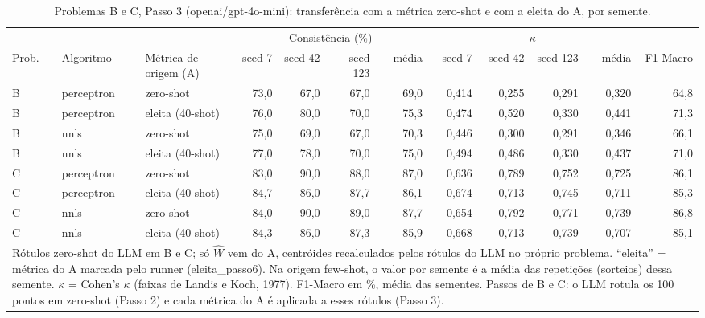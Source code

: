 \begin{table}[htbp]
\centering
\footnotesize
\caption{Problemas B e C, Passo 3 (openai/gpt-4o-mini): transferência com a métrica zero-shot e com a eleita do A, por semente.}
\label{tab:BC_passo3_por_semente_gpt4mini}
\begin{tabular}{lllrrrrrrrrr}
\toprule
 &  &  & \multicolumn{4}{c}{Consistência (\%)} & \multicolumn{4}{c}{$\kappa$} &  \\ \cmidrule(lr){4-7} \cmidrule(lr){8-11}
Prob. & Algoritmo & Métrica de origem (A) & seed 7 & seed 42 & seed 123 & média & seed 7 & seed 42 & seed 123 & média & F1-Macro \\
\midrule
B & perceptron & zero-shot & 73,0 & 67,0 & 67,0 & 69,0 & 0,414 & 0,255 & 0,291 & 0,320 & 64,8 \\
B & perceptron & eleita (40-shot) & 76,0 & 80,0 & 70,0 & 75,3 & 0,474 & 0,520 & 0,330 & 0,441 & 71,3 \\
B & nnls & zero-shot & 75,0 & 69,0 & 67,0 & 70,3 & 0,446 & 0,300 & 0,291 & 0,346 & 66,1 \\
B & nnls & eleita (40-shot) & 77,0 & 78,0 & 70,0 & 75,0 & 0,494 & 0,486 & 0,330 & 0,437 & 71,0 \\
\midrule
C & perceptron & zero-shot & 83,0 & 90,0 & 88,0 & 87,0 & 0,636 & 0,789 & 0,752 & 0,725 & 86,1 \\
C & perceptron & eleita (40-shot) & 84,7 & 86,0 & 87,7 & 86,1 & 0,674 & 0,713 & 0,745 & 0,711 & 85,3 \\
C & nnls & zero-shot & 84,0 & 90,0 & 89,0 & 87,7 & 0,654 & 0,792 & 0,771 & 0,739 & 86,8 \\
C & nnls & eleita (40-shot) & 84,3 & 86,0 & 87,3 & 85,9 & 0,668 & 0,713 & 0,739 & 0,707 & 85,1 \\
\bottomrule
\multicolumn{12}{p{0.95\linewidth}}{\footnotesize Rótulos zero-shot do LLM em B e C; só $\hat{W}$ vem do A, centróides recalculados pelos rótulos do LLM no próprio problema. ``eleita'' = métrica do A marcada pelo runner (eleita\_passo6). Na origem few-shot, o valor por semente é a média das repetições (sorteios) dessa semente. $\kappa$ = Cohen's $\kappa$ (faixas de Landis e Koch, 1977). F1-Macro em \%, média das sementes. Passos de B e C: o LLM rotula os 100 pontos em zero-shot (Passo 2) e cada métrica do A é aplicada a esses rótulos (Passo 3).} \\
\end{tabular}
\end{table}
